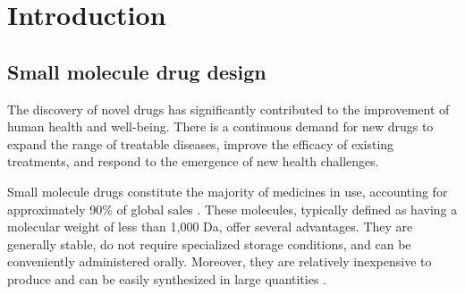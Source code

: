 \chapter{Introduction\label{chap:introduction}}
\section{Small molecule drug design\label{sec:drug-design}}

The discovery of novel drugs has significantly contributed to the improvement of human health and
well-being. There is a continuous demand for new drugs to expand the range of treatable diseases,
improve the efficacy of existing treatments, and respond to the emergence of new health challenges.

Small molecule drugs constitute the majority of medicines in use, accounting for approximately 90\%
of global sales \citep{makurvetBiologicsVsSmall2021}. These molecules, typically defined as having a
molecular weight of less than 1,000 Da, offer several advantages. They are generally stable, do not
require specialized storage conditions, and can be conveniently administered orally. Moreover, they
are relatively inexpensive to produce and can be easily synthesized in large quantities
\citep{southeyIntroductionSmallMolecule2023}.

